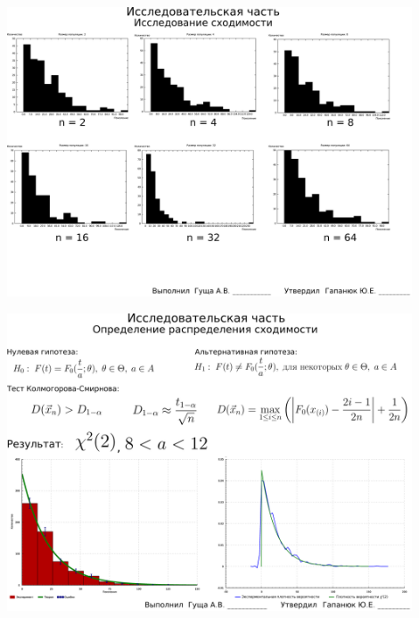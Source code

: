 \documentclass[russian,utf8, a1paper, emptystyle]{eskdgraph}
\begin{document}
\begin{ESKDdrawing}
\includegraphics[width=0.90\textwidth]{lists/list10_2}
\end{ESKDdrawing}

\begin{ESKDdrawing}
\includegraphics[width=0.90\textwidth]{lists/list10_3}
\end{ESKDdrawing}
\end{document}
